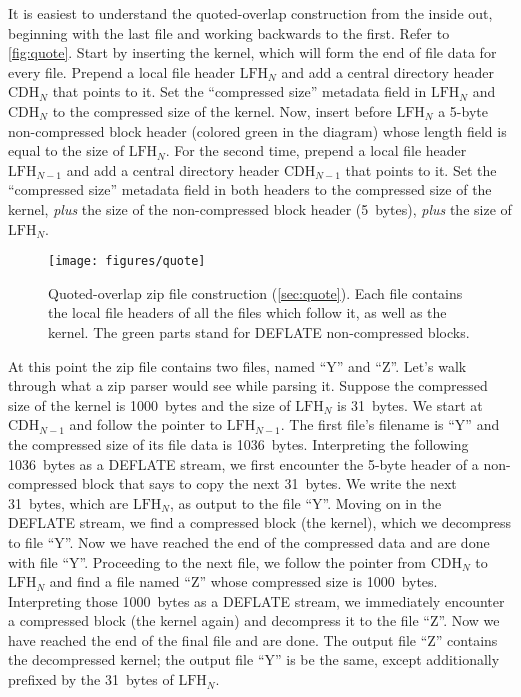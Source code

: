 \documentclass[letterpaper,twocolumn,10pt]{article}
\newcommand{\CDH}{\mathrm{CDH}}
\newcommand{\LFH}{\mathrm{LFH}}
\begin{document}
It is easiest to understand the quoted-overlap construction from the inside out,
beginning with the last file and working backwards to the first.
Refer to \autoref{fig:quote}.
Start by inserting the kernel, which will form the end of file data for every file.
Prepend a local file header $\LFH_N$
and add a central directory header $\CDH_N$ that points to it.
Set the ``compressed size'' metadata field in $\LFH_N$ and $\CDH_N$ to the compressed size of the kernel.
Now, insert before $\LFH_N$ a 5-byte non-compressed block header (colored green in the diagram)
whose length field is equal to the size of $\LFH_N$.
For the second time,
prepend a local file header $\LFH_{N-1}$
and add a central directory header $\CDH_{N-1}$ that points to it.
Set the ``compressed size'' metadata field in both headers to the compressed size of the kernel,
\emph{plus} the size of the non-compressed block header (\SI{5}{bytes}),
\emph{plus} the size of $\LFH_N$.

\begin{figure*}
\texttt{[image: figures/quote]}
\caption{
Quoted-overlap zip file construction
(\autoref{sec:quote}).
Each file contains the local file headers of all the files which follow it,
as well as the kernel.
The green parts stand for DEFLATE non-compressed blocks.
}
\label{fig:quote}
\end{figure*}

At this point the zip file contains two files, named ``Y'' and ``Z''.
Let's walk through what a zip parser would see while parsing it.
Suppose the compressed size of the kernel is \SI{1000}{bytes}
and the size of $\LFH_N$ is \SI{31}{bytes}.
We start at $\CDH_{N-1}$
and follow the pointer to $\LFH_{N-1}$.
The first file's filename is ``Y'' and
the compressed size of its file data is \SI{1036}{bytes}.
Interpreting the following \SI{1036}{bytes} as a DEFLATE stream,
we first encounter the 5-byte header of a non-compressed block
that says to copy the next \SI{31}{bytes}.
We write the next \SI{31}{bytes},
which are $\LFH_N$,
as output to the file ``Y''.
Moving on in the DEFLATE stream, we find a compressed block (the kernel),
which we decompress to file ``Y''.
Now we have reached the end of the compressed data and are done with file ``Y''.
Proceeding to the next file, we follow the pointer from $\CDH_N$
to $\LFH_N$ and find a file named ``Z''
whose compressed size is \SI{1000}{bytes}.
Interpreting those \SI{1000}{bytes} as a DEFLATE stream,
we immediately encounter a compressed block (the kernel again)
and decompress it to the file ``Z''.
Now we have reached the end of the final file and are done.
The output file ``Z'' contains the decompressed kernel;
the output file ``Y'' is be the same, except additionally prefixed by
the \SI{31}{bytes} of
$\LFH_N$.
\end{document}
